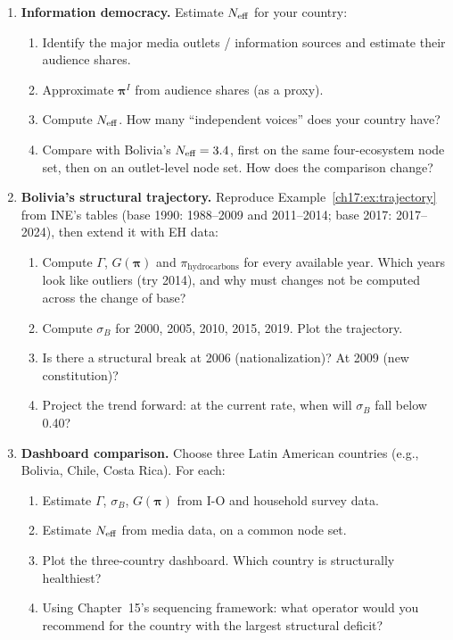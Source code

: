 \documentclass[../structural_economics_book.tex]{subfiles}
\begin{document}
\begin{enumerate}[label=\textbf{17.\arabic*}, leftmargin=3em]
\item \textbf{Information democracy.} Estimate $N_{\text{eff}}$ for your country:
\begin{enumerate}
\item Identify the major media outlets / information sources and estimate their audience shares.
\item Approximate $\boldsymbol{\pi}^I$ from audience shares (as a proxy).
\item Compute $N_{\text{eff}}$. How many ``independent voices'' does your country have?
\item Compare with Bolivia's $N_{\text{eff}} = 3.4$, first on the same four-ecosystem node set, then on an outlet-level node set. How does the comparison change?
\end{enumerate}

\item \textbf{Bolivia's structural trajectory.} Reproduce Example~\ref{ch17:ex:trajectory} from INE's tables (base 1990: 1988--2009 and 2011--2014; base 2017: 2017--2024), then extend it with EH data:
\begin{enumerate}
\item Compute $\Gamma$, $G(\boldsymbol{\pi})$ and $\pi_{\text{hydrocarbons}}$ for every available year. Which years look like outliers (try 2014), and why must changes not be computed across the change of base?
\item Compute $\sigma_B$ for 2000, 2005, 2010, 2015, 2019. Plot the trajectory.
\item Is there a structural break at 2006 (nationalization)? At 2009 (new constitution)?
\item Project the trend forward: at the current rate, when will $\sigma_B$ fall below 0.40?
\end{enumerate}

\item \textbf{Dashboard comparison.} Choose three Latin American countries (e.g., Bolivia, Chile, Costa Rica). For each:
\begin{enumerate}
\item Estimate $\Gamma$, $\sigma_B$, $G(\boldsymbol{\pi})$ from I-O and household survey data.
\item Estimate $N_{\text{eff}}$ from media data, on a common node set.
\item Plot the three-country dashboard. Which country is structurally healthiest?
\item Using Chapter~15's sequencing framework: what operator would you recommend for the country with the largest structural deficit?
\end{enumerate}


\end{enumerate}
\end{document}
